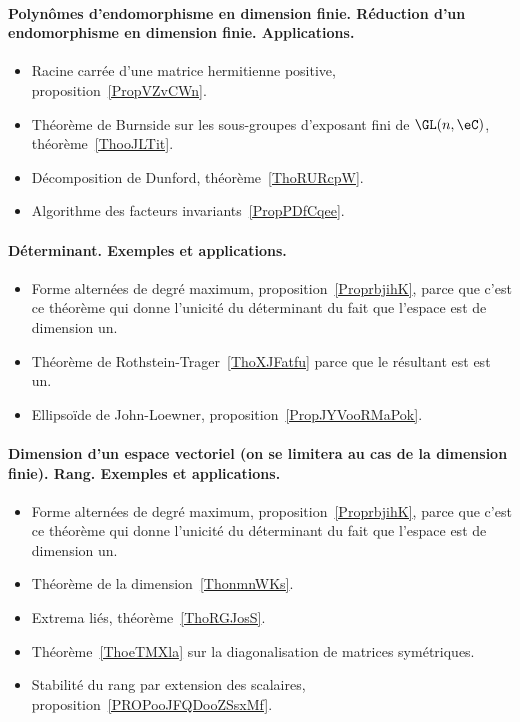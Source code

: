 \paragraph{Polynômes d'endomorphisme en dimension finie. Réduction d’un endomorphisme en dimension finie. Applications.}
\begin{itemize}
    \item Racine carrée d'une matrice hermitienne positive, proposition~\ref{PropVZvCWn}.
    \item Théorème de Burnside sur les sous-groupes d'exposant fini de \( \GL(n,\eC)\), théorème~\ref{ThooJLTit}.
    \item Décomposition de Dunford, théorème~\ref{ThoRURcpW}.
    \item Algorithme des facteurs invariants~\ref{PropPDfCqee}.
\end{itemize}
\paragraph{Déterminant. Exemples et applications.}
\begin{itemize}
    \item Forme alternées de degré maximum, proposition~\ref{ProprbjihK}, parce que c'est ce théorème qui donne l'unicité du déterminant du fait que l'espace est de dimension un.
    \item Théorème de Rothstein-Trager~\ref{ThoXJFatfu} parce que le résultant est est un.
    \item Ellipsoïde de John-Loewner, proposition~\ref{PropJYVooRMaPok}.
\end{itemize}
\paragraph{Dimension d'un espace vectoriel (on se limitera au cas de la dimension finie). Rang. Exemples et applications.}
\begin{itemize}
    \item Forme alternées de degré maximum, proposition~\ref{ProprbjihK}, parce que c'est ce théorème qui donne l'unicité du déterminant du fait que l'espace est de dimension un.
    \item Théorème de la dimension~\ref{ThonmnWKs}.
    \item Extrema liés, théorème~\ref{ThoRGJosS}.
    \item Théorème~\ref{ThoeTMXla} sur la diagonalisation de matrices symétriques.
    \item Stabilité du rang par extension des scalaires, proposition~\ref{PROPooJFQDooZSsxMf}.
\end{itemize}
